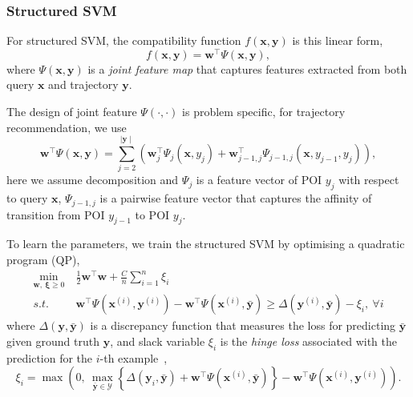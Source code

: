 \documentclass[9pt]{extarticle}
\begin{document}
\subsubsection{Structured SVM}
\label{sec:ssvm}

For structured SVM, the compatibility function $f(\mathbf{x}, \mathbf{y})$ is this linear form,
\begin{equation*}
f(\mathbf{x}, \mathbf{y}) = \mathbf{w}^\top \Psi(\mathbf{x}, \mathbf{y}),
\end{equation*}
where $\Psi(\mathbf{x}, \mathbf{y})$ is a \emph{joint feature map} 
that captures features extracted from both query $\mathbf{x}$ and trajectory $\mathbf{y}$.

The design of joint feature $\Psi(\cdot,\cdot)$ is problem specific, 
for trajectory recommendation, we use
\begin{equation*}
\label{eq:jointfeature}
\mathbf{w}^\top \Psi(\mathbf{x}, \mathbf{y}) 
= \sum_{j=2}^{\mid \mathbf{y} \mid} 
  \left( \mathbf{w}_j^\top \Psi_j(\mathbf{x}, y_j) + 
  \mathbf{w}_{j-1,j}^\top \Psi_{j-1, j}(\mathbf{x}, y_{j-1}, y_j) \right),
\end{equation*}
here we assume decomposition and $\Psi_j$ is a feature vector of POI $y_j$ with respect to query $\mathbf{x}$,
$\Psi_{j-1,j}$ is a pairwise feature vector that captures the affinity of transition from POI $y_{j-1}$ to POI $y_j$.

To learn the parameters, we train the structured SVM by optimising a quadratic program (QP),
\begin{equation}
\label{eq:nslackform}
\begin{aligned}
\min_{\mathbf{w}, ~\bm{\xi} \ge 0} ~& \frac{1}{2} \mathbf{w}^\top \mathbf{w} + \frac{C}{n} \sum_{i=1}^n \xi_i \\
s.t.~~ ~& \mathbf{w}^\top \Psi(\mathbf{x}^{(i)}, \mathbf{y}^{(i)}) - \mathbf{w}^\top \Psi(\mathbf{x}^{(i)}, \bar{\mathbf{y}}) \ge 
       \Delta(\mathbf{y}^{(i)}, \bar{\mathbf{y}}) - \xi_i, ~\forall i
\end{aligned}
\end{equation}
where $\Delta(\mathbf{y}, \bar{\mathbf{y}})$ is a discrepancy function that measures the loss 
for predicting $\bar{\mathbf{y}}$ given ground truth $\mathbf{y}$, 
and slack variable $\xi_i$ is the \emph{hinge loss} associated with the prediction for the $i$-th example~\cite{tsochantaridis2005large},
\begin{equation*}
\xi_i = \max \left( 0,~ 
        \max_{\bar{\mathbf{y}} \in \mathcal{Y}} 
        \left\{ \Delta(\mathbf{y}_i, \bar{\mathbf{y}}) + \mathbf{w}^\top \Psi(\mathbf{x}^{(i)}, \bar{\mathbf{y}}) \right\} -
        \mathbf{w}^\top \Psi(\mathbf{x}^{(i)}, \mathbf{y}^{(i)}) \right).
\end{equation*}
\end{document}
